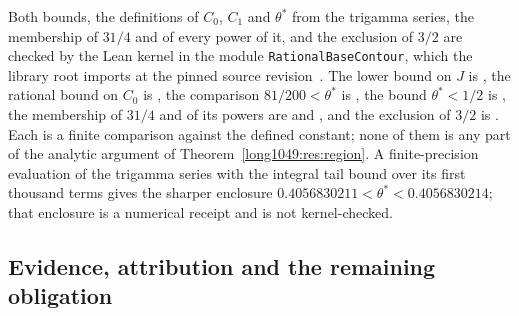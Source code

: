 Both bounds, the definitions of $C_0$, $C_1$ and $\theta^{*}$ from the trigamma
series, the membership of $31/4$ and of every power of it, and the exclusion of
$3/2$ are checked by the Lean kernel in the module
\texttt{RationalBaseContour}, which the library root imports at the pinned
source revision~\commitshort.  The lower bound on $J$ is
,
the rational bound on $C_0$ is
, the
comparison $81/200<\theta^{*}$ is
, the bound $\theta^{*}<1/2$ is
, the membership of $31/4$ and of its powers are
 and
, and the exclusion of $3/2$ is
.  Each is a finite comparison against the defined constant; none
of them is any part of the analytic argument of
Theorem~\ref{long1049:res:region}.  A finite-precision evaluation of the trigamma series
with the integral tail bound over its first thousand terms gives the sharper
enclosure $0.4056830211<\theta^{*}<0.4056830214$; that enclosure is a numerical
receipt and is not kernel-checked.

\subsection{Evidence, attribution and the remaining obligation}

